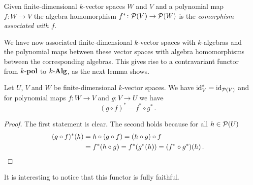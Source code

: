 \begin{defi}
  Given finite-dimensional $k$-vector spaces $W$ and $V$ and a polynomial map $f \colon W \to V$ the algebra homomorphism $f^* \colon \mathcal{P}(V) \to \mathcal{P}(W)$ is the \emph{comorphism associated with $f$}.
\end{defi}
  

We have now associated finite-dimensional $k$-vector spaces with $k$-algebras and the polynomial maps between these vector spaces with algebra homomorphisms between the corresponding algebras.
This gives rise to a contravariant functor from $k\text{-}\mathbf{pol}$ to $k\text{-}\mathbf{Alg}$, as the next lemma shows.


\begin{prop}
  Let $U$, $V$ and $W$ be finite-dimensional $k$-vector spaces.
  We have $\operatorname{id}_V^* = \operatorname{id}_{\mathcal{P}(V)}$ and for polynomial maps $f \colon W \to V$ and $g \colon V \to U$ we have
  \[
      (g \circ f)^*
    = f^* \circ g^* \,.
  \]
\end{prop}
\begin{proof}
  The first statement is clear.
  The second holds because for all $h \in \mathcal{P}(U)$
  \begin{align*}
      ( g \circ f)^*(h)
    &=  h \circ (g \circ f)
     =  (h \circ g) \circ f \\
    &=  f^* (h \circ g)
     =  f^*(g^*(h))
     = (f^* \circ g^*)(h) \,.
    \qedhere
  \end{align*}
\end{proof}


It is interesting to notice that this functor is fully faithful.


